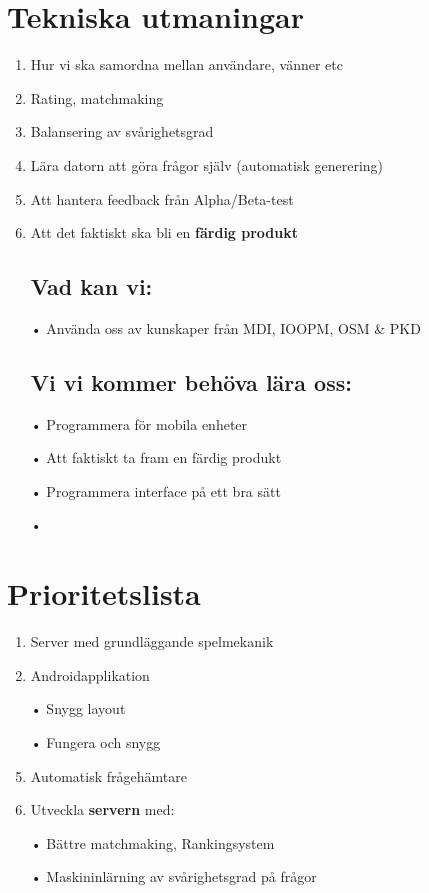 \documentclass[a4paper,11pt]{article}
\begin{document}
\section{Tekniska utmaningar}
\begin{enumerate}
\item Hur vi ska samordna mellan användare, vänner etc
\item Rating, matchmaking
\item Balansering av svårighetsgrad
\item Lära datorn att göra frågor själv (automatisk generering)
\item Att hantera feedback från Alpha/Beta-test
\item Att det faktiskt ska bli en \textbf{färdig produkt}

\subsection{Vad kan vi:}
\item[•] Använda oss av kunskaper från MDI, IOOPM, OSM \& PKD

\subsection{Vi vi kommer behöva lära oss:}
\item[•] Programmera för mobila enheter
\item[•] Att faktiskt ta fram en färdig produkt
\item[•] Programmera interface på ett bra sätt
\item[•] 

\end{enumerate}

\section{Prioritetslista}
\begin{enumerate}
\item Server med grundläggande spelmekanik
\item Androidapplikation
\item[•] Snygg layout
\item[•] Fungera och snygg
\item Automatisk frågehämtare
\item Utveckla \textbf{servern} med: 
\item[•] Bättre matchmaking, Rankingsystem 
\item[•] Maskininlärning av svårighetsgrad på frågor

\end{enumerate}
\end{document}
